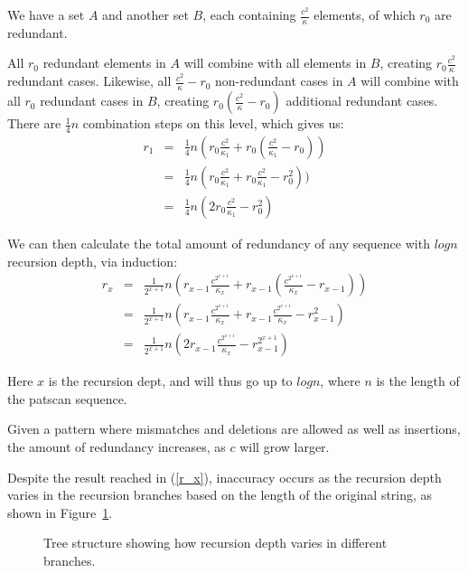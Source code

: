 \documentclass[12pt]{article}
\theoremstyle{definition}
\begin{document}
\begin{example}
We have a set $A$ and another set $B$, each containing $\frac{c^2}{\kappa}$ elements, of which $r_0$ are redundant.

All $r_0$ redundant elements in $A$ will combine with all elements in $B$, creating $r_0\frac{c^2}{\kappa}$ redundant cases. Likewise, all $\frac{c^2}{\kappa}-r_0$ non-redundant cases in $A$ will combine with all $r_0$ redundant cases in $B$, creating $r_0(\frac{c^2}{\kappa}-r_0)$ additional redundant cases. There are $\frac{1}{4}n$ combination steps on this level, which gives us:
\begin{eqnarray}
	r_1 &=& \frac{1}{4}n(r_0\frac{c^2}{\kappa_1} + r_0(\frac{c^2}{\kappa_1} - r_0))\\
		&=& \frac{1}{4}n(r_0\frac{c^2}{\kappa_1} + r_0\frac{c^2}{\kappa_1} - r_0^2))\\
		&=& \frac{1}{4}n(2r_0\frac{c^2}{\kappa_1} - r_0^2)
\end{eqnarray}
\end{example}

We can then calculate the total amount of redundancy of any sequence with $logn$ recursion depth, via induction:
\begin{eqnarray}
	r_x &=& \frac{1}{2^{x+1}}n (r_{x-1}\frac{c^{2^{x+1}}}{\kappa_x} + r_{x-1}(\frac{c^{2^{x+1}}}{\kappa_x} - r_{x-1}))\\
		&=& \frac{1}{2^{x+1}}n (r_{x-1}\frac{c^{2^{x+1}}}{\kappa_x} + r_{x-1}\frac{c^{2^{x+1}}}{\kappa_x} - r_{x-1}^2)\\
		\label{r_x}
		&=& \frac{1}{2^{x+1}}n (2r_{x-1}\frac{c^{2^{x+1}}}{\kappa_x} - r_{x-1}^{2^{x+1}})
\end{eqnarray}

Here $x$ is the recursion dept, and will thus go up to $logn$, where $n$ is the length of the patscan sequence.

Given a pattern where mismatches and deletions are allowed as well as insertions, the amount of redundancy increases, as $c$ will grow larger.

Despite the result reached in (\ref{r_x}), inaccuracy occurs as the recursion depth varies in the recursion branches based on the length of the original string, as shown in Figure~\ref{fig:recursion_depth_example}.

\begin{figure}[H]
	\centering
	\caption{Tree structure showing how recursion depth varies in different branches.}
	\label{fig:recursion_depth_example}
\end{figure}
\end{document}
